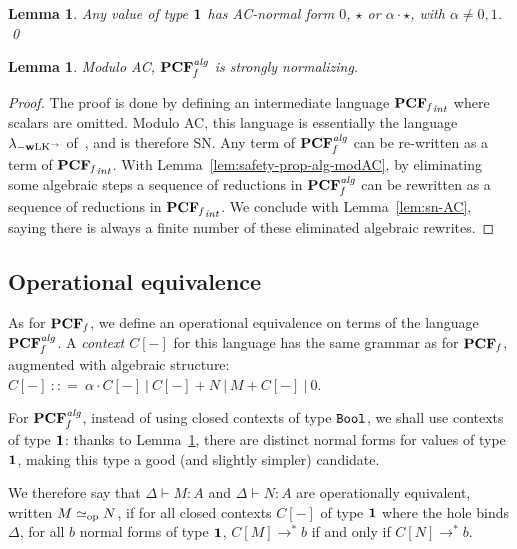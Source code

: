 \documentclass[10pt]{article}
\theoremstyle{plain}
\newtheorem{lemma}[theorem]{Lemma}
\theoremstyle{definition}
\newcommand{\entail}{\vdash}
\newcommand{\bor}{\ |\ }
\newcommand{\punit}{{\star}}
\newcommand{\tunit}{{\bf 1}}
\newcommand{\bit}{{\tt Bool}}
\newcommand{\opeq}{\mathrel{\simeq_{\rm op}}}
\begin{document}
\begin{lemma}
  \label{lem:uniq-value-alg}
  Any value of type $\tunit$ has AC-normal form $0$, $\punit$ or
  $\alpha\cdot\punit$, with $\alpha\neq 0,1$.
  \qed
\end{lemma}

\begin{lemma}
  \label{lem:sn-alg}
  Modulo AC, ${\bf PCF}_{\it f}^{\it alg}$ is strongly normalizing.
\end{lemma}

\begin{proof}
  The proof is done by defining an intermediate language ${{\bf PCF}_{\it f}}_{\it
    int}$ where scalars are omitted. Modulo AC, this language is
  essentially the language $\lambda_{-{\bf w}{\rm LK}^\to}$
  of~\cite{groote94}, and is therefore SN. Any term of ${\bf PCF}_{\it f}^{\it
    alg}$ can be re-written as a term of ${{\bf PCF}_{\it f}}_{\it int}$. With
  Lemma~\ref{lem:safety-prop-alg-modAC}, by eliminating some algebraic
  steps a sequence of reductions in ${\bf PCF}_{\it f}^{\it alg}$ can be
  rewritten as a sequence of reductions in ${{\bf PCF}_{\it f}}_{\it int}$. We
  conclude with Lemma~\ref{lem:sn-AC}, saying there is always a finite
  number of these eliminated algebraic rewrites.
\end{proof}



\subsection{Operational equivalence}
\label{sec:lc-cat-alg}

As for ${\bf PCF}_{\it f}$, we define an operational equivalence on terms of the 
language
${\bf PCF}_{\it f}^{\it alg}$. A {\em context $C[-]$} for this language has the same
grammar as for ${\bf PCF}_{\it f}$, augmented with algebraic
structure: 
$C[-]~{:}{:}{=}~
  \alpha\cdot{}C[-] \bor C[-] + N \bor M + C[-] \bor 0$.

For ${\bf PCF}_{\it f}^{\it alg}$, instead of using closed contexts of type
$\bit$, we shall use contexts of type $\tunit$: thanks to
Lemma~\ref{lem:uniq-value-alg}, there are distinct normal forms for
values of type $\tunit$, making this type a good (and slightly simpler)
candidate.

We therefore say that $\Delta\entail M:A$ and $\Delta\entail N:A$ are
operationally equivalent, written $M\opeq N$, if for all closed
contexts $C[-]$ of type $\tunit$ where the hole binds $\Delta$, for
all $b$ normal forms of type $\tunit$, $C[M]\to^* b$ if and only if $
C[N]\to^* b $.
\end{document}
